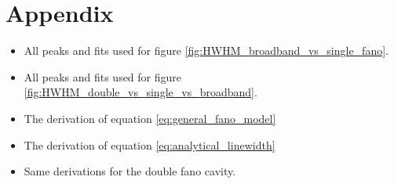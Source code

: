 \section{Appendix}

\begin{itemize}
    \item All peaks and fits used for figure \ref{fig:HWHM_broadband_vs_single_fano}.
    \item All peaks and fits used for figure \ref{fig:HWHM_double_vs_single_vs_broadband}.
    \item The derivation of equation \ref{eq:general_fano_model}
    \item The derivation of equation \ref{eq:analytical_linewidth}
    \item Same derivations for the double fano cavity.
\end{itemize}